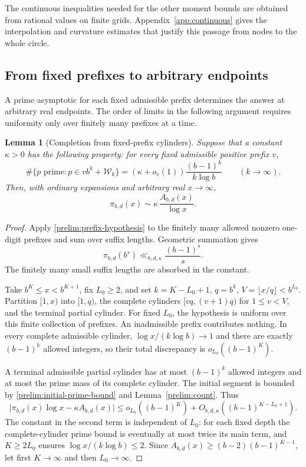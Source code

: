 \documentclass[11pt,a4paper]{article}
\theoremstyle{paperplain}
\newtheorem{lemma}[theorem]{Lemma}
\numberwithin{equation}{section}
\begin{document}
The continuous inequalities needed for the other moment bounds are obtained
from rational values on finite grids. Appendix~\ref{app:continuous}
gives the interpolation and curvature estimates that justify this passage
from nodes to the whole circle.

\subsection{From fixed prefixes to arbitrary endpoints}

A prime asymptotic for each fixed admissible prefix determines the answer
at arbitrary real endpoints. The order of limits in the following argument
requires uniformity only over finitely many prefixes at a time.

\begin{lemma}[Completion from fixed-prefix cylinders]\label{prelim:endpoints}
Suppose that a constant $\kappa>0$ has the following property: for every
fixed admissible positive prefix $v$,
\begin{equation}\label{prelim:prefix-hypothesis}
 \#\{p\text{ prime}:p\in vb^k+\mathcal W_k\}
 =(\kappa+o_v(1))\frac{(b-1)^k}{k\log b}
 \qquad(k\to\infty).
\end{equation}
Then, with ordinary expansions and arbitrary real $x\to\infty$,
\[
 \pi_{b,d}(x)\sim\kappa\,\frac{A_{b,d}(x)}{\log x}.
\]
\end{lemma}
\begin{proof}
Apply \eqref{prelim:prefix-hypothesis} to the finitely many allowed
nonzero one-digit prefixes and sum over suffix lengths. Geometric
summation gives
\begin{equation}\label{prelim:initial-prime-bound}
 \pi_{b,d}(b^s)\ll_{b,d,\kappa}\frac{(b-1)^s}{s}.
\end{equation}
The finitely many small suffix lengths are absorbed in the constant.

Take $b^K\leqslant x<b^{K+1}$, fix $L_0\geqslant2$, and set
$k=K-L_0+1$, $q=b^k$, $V=\lfloor x/q\rfloor<b^{L_0}$.
Partition $[1,x)$ into $[1,q)$, the complete cylinders
$[vq,(v+1)q)$ for $1\leqslant v<V$, and the terminal partial cylinder.
For fixed $L_0$, the hypothesis is uniform over this finite collection
of prefixes. An inadmissible prefix contributes nothing. In every complete
admissible cylinder, $\log x/(k\log b)\to1$ and there are exactly
$(b-1)^k$ allowed integers, so their total discrepancy is
$o_{L_0}((b-1)^K)$.

A terminal admissible partial cylinder has at most $(b-1)^k$ allowed
integers and at most the prime mass of its complete cylinder.
The initial segment is bounded by
\eqref{prelim:initial-prime-bound} and Lemma~\ref{prelim:count}.
Thus
\[
 \bigl|\pi_{b,d}(x)\log x-\kappa A_{b,d}(x)\bigr|
 \leqslant o_{L_0}((b-1)^K)
       +O_{b,d,\kappa}((b-1)^{K-L_0+1}).
\]
The constant in the second term is independent of $L_0$: for each fixed
depth the complete-cylinder prime bound is eventually at most twice
its main term, and $K\geqslant2L_0$ ensures
$\log x/(k\log b)\leqslant2$. Since
$A_{b,d}(x)\geqslant(b-2)(b-1)^{K-1}$, let first $K\to\infty$ and
then $L_0\to\infty$.
\end{proof}
\end{document}
